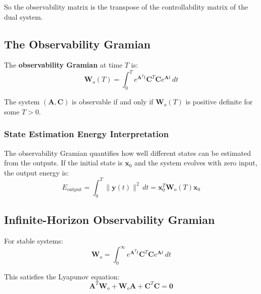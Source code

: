 So the observability matrix is the transpose of the controllability matrix of the dual system.

\subsection{The Observability Gramian}

\begin{definition}
The \textbf{observability Gramian} at time $T$ is:
\begin{equation}
\mathbf{W}_o(T) = \int_0^T e^{\mathbf{A}^Tt}\mathbf{C}^T\mathbf{C}e^{\mathbf{A}t} \, dt
\label{eq:observability_gramian_finite}
\end{equation}
\end{definition}

\begin{theorem}
The system $(\mathbf{A}, \mathbf{C})$ is observable if and only if $\mathbf{W}_o(T)$ is positive definite for some $T > 0$.
\end{theorem}

\subsubsection{State Estimation Energy Interpretation}

The observability Gramian quantifies how well different states can be estimated from the outputs. If the initial state is $\mathbf{x}_0$ and the system evolves with zero input, the output energy is:
\begin{equation}
E_{\text{output}} = \int_0^T \|\mathbf{y}(t)\|^2 \, dt = \mathbf{x}_0^T \mathbf{W}_o(T) \mathbf{x}_0
\end{equation}


\subsection{Infinite-Horizon Observability Gramian}

For stable systems:
\begin{equation}
\mathbf{W}_o = \int_0^\infty e^{\mathbf{A}^Tt}\mathbf{C}^T\mathbf{C}e^{\mathbf{A}t} \, dt
\end{equation}

This satisfies the Lyapunov equation:
\begin{equation}
\boxed{\mathbf{A}^T\mathbf{W}_o + \mathbf{W}_o\mathbf{A} + \mathbf{C}^T\mathbf{C} = \mathbf{0}}
\label{eq:lyapunov_observability}
\end{equation}

